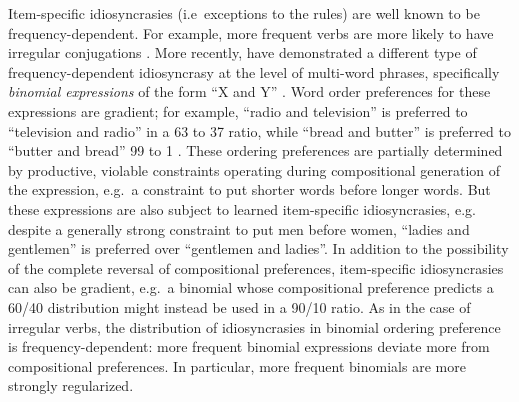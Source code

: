 \documentclass{evolang11}
\begin{document}
Item-specific idiosyncrasies (i.e\ exceptions to the rules) are well known to be frequency-dependent. For example, more frequent verbs are more likely to have irregular conjugations \cite{Lieberman:2007bl}.
More recently,  have demonstrated a different type of frequency-dependent idiosyncrasy at the level of multi-word phrases, specifically \emph{binomial expressions} of the form ``X and Y'' \cite{Cooper:1975uz,Benor:2006gv}. Word order preferences for these expressions are gradient; for example, ``radio and television'' is preferred to ``television and radio'' in a 63 to 37 ratio, while ``bread and butter'' is preferred to ``butter and bread'' 99 to 1 \cite{Lin:2012te}. These ordering preferences are partially determined by productive, violable constraints operating during compositional generation of the expression, e.g.\ a constraint to put shorter words before longer words. But these expressions are also subject to learned item-specific idiosyncrasies, e.g. despite a generally strong constraint to put men before women, ``ladies and gentlemen'' is preferred over ``gentlemen and ladies''. In addition to the possibility of the complete reversal of compositional preferences, item-specific idiosyncrasies can also be gradient, e.g.\ a binomial whose compositional preference predicts a 60/40 distribution might instead be used in a 90/10 ratio. 
%
As in the case of irregular verbs, the distribution of idiosyncrasies in binomial ordering preference is frequency-dependent: more frequent binomial expressions deviate more from compositional preferences.  In particular, more frequent binomials are more strongly regularized.
\end{document}
